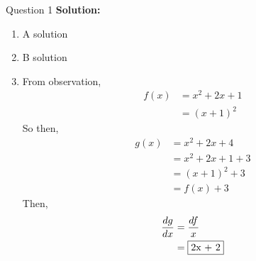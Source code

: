 \item Question 1
\medbreak\noindent\textbf{Solution:}\\
\begin{enumerate}[label=(\alph*)]
    \item A solution
    \item B solution
    \item From observation,
    \begin{align*}
        f(x) &= x^2 + 2x + 1\\
        &= (x + 1)^2
    \end{align*}
    So then,
    \begin{align*}
        g(x) &= x^2 + 2x + 4\\
        &= x^2 + 2x + 1 + 3\\
        &= (x + 1)^2 + 3\\
        &= f(x) + 3
    \end{align*}
    Then,
    \begin{align*}
        \frac{dg}{dx} &= \frac{df}{x}\\
        &= \fbox{2x + 2}
    \end{align*}
\end{enumerate}